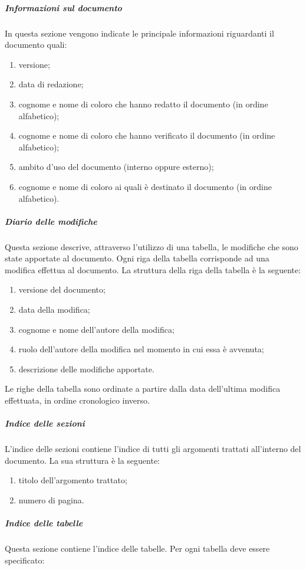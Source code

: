\documentclass[../NormeProgetto.tex]{subfiles}
\begin{document}
		\subparagraph{Informazioni sul documento}
		In questa sezione vengono indicate le principale informazioni riguardanti il documento quali:
		\begin{enumerate}
			\item versione;
			\item data di redazione;
			\item cognome e nome di coloro che hanno redatto il documento (in ordine alfabetico);
			\item cognome e nome di coloro che hanno verificato il documento (in ordine alfabetico);
			\item ambito d'uso del documento (interno oppure esterno);
			\item cognome e nome di coloro ai quali è destinato il documento (in ordine alfabetico).
		\end{enumerate}

		\subparagraph{Diario delle modifiche}
		Questa sezione descrive, attraverso l'utilizzo di una tabella, le modifiche che sono state apportate al documento. Ogni riga della tabella corrisponde ad una modifica effettua al documento. La struttura della riga della tabella è la seguente:
		\begin{enumerate}
			\item versione del documento;
			\item data della modifica;
			\item cognome e nome dell'autore della modifica;
			\item ruolo dell'autore della modifica nel momento in cui essa è avvenuta;
			\item descrizione delle modifiche apportate.
		\end{enumerate}

		Le righe della tabella sono ordinate a partire dalla data dell'ultima modifica effettuata, in ordine cronologico inverso.

		\subparagraph{Indice delle sezioni}
		L'indice delle sezioni contiene l'indice di tutti gli argomenti trattati all'interno del documento. La sua struttura è la seguente:

		\begin{enumerate}
			\item titolo dell'argomento trattato;
			\item numero di pagina.
		\end{enumerate}

		\subparagraph{Indice delle tabelle}
		Questa sezione contiene l'indice delle tabelle. Per ogni tabella deve essere specificato:
\end{document}
